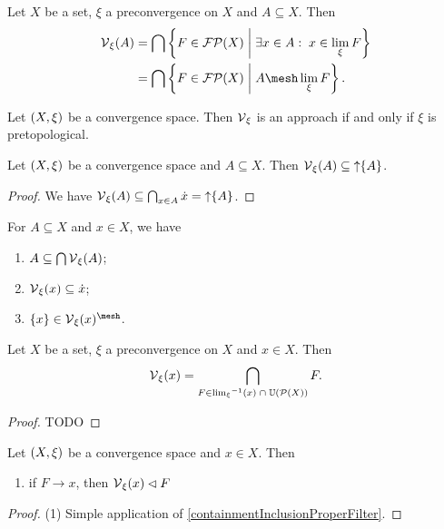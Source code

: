 \begin{lemma}
Let $X$ be a set, $\xi$ a preconvergence on $X$ and $A\subseteq X$. Then
\begin{align*}
\vicinity_\xi(A) &= \bigcap \setbuilder{F\in \powerfilters(X)}{\exists x\in A: \; x\in \lim_\xi F} \\
&= \bigcap \setbuilder{F\in \powerfilters(X)}{A \mesh \lim_\xi F}.
\end{align*}
\end{lemma}

\begin{lemma}
Let $\left( X,\xi \right)$ be a convergence space. Then $\operatorname{\mathcal{V}}_\xi$ is an approach \textup{if and only if} $\xi$ is pretopological.
\end{lemma}

\begin{lemma} \label{vicinityOfSetLemma}
Let $\left( X,\xi \right)$ be a convergence space and $A\subseteq X$. Then $\operatorname{\mathcal{V}}_\xi(A) \subseteq \operatorname{\uparrow}\{A\}$.
\end{lemma}
\begin{proof}
We have $\operatorname{\mathcal{V}}_\xi(A) \subseteq \bigcap_{x\in A}\dot{x} = \operatorname{\uparrow} \{A\}$. 
\end{proof}
\begin{corollary} \label{vicinityOfSetCorollary}
For $A\subseteq X$ and $x\in X$, we have
\begin{enumerate}
\item $A \subseteq \bigcap\operatorname{\mathcal{V}}_\xi(A)$;
\item $\operatorname{\mathcal{V}}_\xi(x) \subseteq \dot{x}$;
\item $\{x\}\in\vicinity_\xi(x)^{\mesh}$.
\end{enumerate}
\end{corollary}

\begin{lemma}
Let $X$ be a set, $\xi$ a preconvergence on $X$ and $x\in X$. Then
\[ \operatorname{\mathcal{V}}_\xi(x) = \bigcap_{F\in {\lim_\xi}^{-1}(x)\;\cap\; \operatorname{\mathbb{U}}(\operatorname{\mathcal{P}}(X))}F. \]
\end{lemma}
\begin{proof}
TODO
\end{proof}

\begin{lemma}
Let $\left( X,\xi \right)$ be a convergence space and $x\in X$. Then
\begin{enumerate}
\item if $F\to x$, then $\operatorname{\mathcal{V}}_\xi(x)\lhd F$
\end{enumerate}
\end{lemma}
\begin{proof}
(1) Simple application of \ref{containmentInclusionProperFilter}.
\end{proof}

